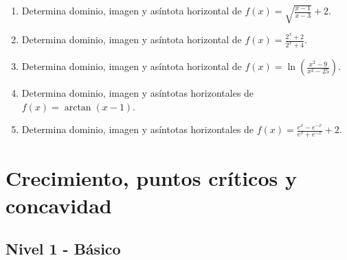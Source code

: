 \documentclass[11pt,a4paper]{article}
\begin{document}
\begin{enumerate}[label=\textbf{E\arabic*.},start=81]
\item Determina dominio, imagen y asíntota horizontal de $f(x)=\sqrt{\frac{x-1}{x-3}}+2$.

\item Determina dominio, imagen y asíntota horizontal de $f(x)=\frac{2^x+2}{2^x+4}$. 

\item Determina dominio, imagen y asíntota horizontal de $f(x)=\ln\left(\frac{x^2-9}{x^2-25}\right)$.

\item Determina dominio, imagen y asíntotas horizontales de $f(x)=\arctan(x-1)$.

\item Determina dominio, imagen y asíntotas horizontales de $f(x)=\frac{e^x-e^{-x}}{e^x+e^{-x}}+2$.

\end{enumerate}

\newpage

\section{Crecimiento, puntos críticos y concavidad}

\subsection{Nivel 1 - Básico}
\end{document}
